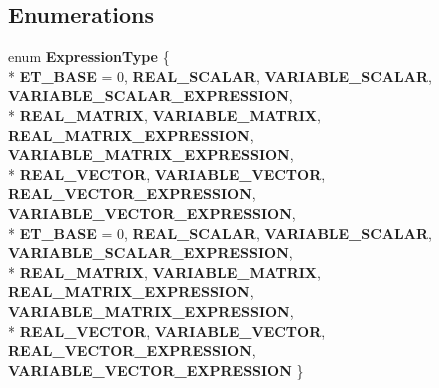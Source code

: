 \subsection*{Enumerations}
\begin{DoxyCompactItemize}
\item 
\hypertarget{namespaceatl_a9d5ac58a60edcd80977d4b562141d9a3}{enum {\bfseries Expression\+Type} \{ \\*
{\bfseries E\+T\+\_\+\+B\+A\+S\+E} = 0, 
{\bfseries R\+E\+A\+L\+\_\+\+S\+C\+A\+L\+A\+R}, 
{\bfseries V\+A\+R\+I\+A\+B\+L\+E\+\_\+\+S\+C\+A\+L\+A\+R}, 
{\bfseries V\+A\+R\+I\+A\+B\+L\+E\+\_\+\+S\+C\+A\+L\+A\+R\+\_\+\+E\+X\+P\+R\+E\+S\+S\+I\+O\+N}, 
\\*
{\bfseries R\+E\+A\+L\+\_\+\+M\+A\+T\+R\+I\+X}, 
{\bfseries V\+A\+R\+I\+A\+B\+L\+E\+\_\+\+M\+A\+T\+R\+I\+X}, 
{\bfseries R\+E\+A\+L\+\_\+\+M\+A\+T\+R\+I\+X\+\_\+\+E\+X\+P\+R\+E\+S\+S\+I\+O\+N}, 
{\bfseries V\+A\+R\+I\+A\+B\+L\+E\+\_\+\+M\+A\+T\+R\+I\+X\+\_\+\+E\+X\+P\+R\+E\+S\+S\+I\+O\+N}, 
\\*
{\bfseries R\+E\+A\+L\+\_\+\+V\+E\+C\+T\+O\+R}, 
{\bfseries V\+A\+R\+I\+A\+B\+L\+E\+\_\+\+V\+E\+C\+T\+O\+R}, 
{\bfseries R\+E\+A\+L\+\_\+\+V\+E\+C\+T\+O\+R\+\_\+\+E\+X\+P\+R\+E\+S\+S\+I\+O\+N}, 
{\bfseries V\+A\+R\+I\+A\+B\+L\+E\+\_\+\+V\+E\+C\+T\+O\+R\+\_\+\+E\+X\+P\+R\+E\+S\+S\+I\+O\+N}, 
\\*
{\bfseries E\+T\+\_\+\+B\+A\+S\+E} = 0, 
{\bfseries R\+E\+A\+L\+\_\+\+S\+C\+A\+L\+A\+R}, 
{\bfseries V\+A\+R\+I\+A\+B\+L\+E\+\_\+\+S\+C\+A\+L\+A\+R}, 
{\bfseries V\+A\+R\+I\+A\+B\+L\+E\+\_\+\+S\+C\+A\+L\+A\+R\+\_\+\+E\+X\+P\+R\+E\+S\+S\+I\+O\+N}, 
\\*
{\bfseries R\+E\+A\+L\+\_\+\+M\+A\+T\+R\+I\+X}, 
{\bfseries V\+A\+R\+I\+A\+B\+L\+E\+\_\+\+M\+A\+T\+R\+I\+X}, 
{\bfseries R\+E\+A\+L\+\_\+\+M\+A\+T\+R\+I\+X\+\_\+\+E\+X\+P\+R\+E\+S\+S\+I\+O\+N}, 
{\bfseries V\+A\+R\+I\+A\+B\+L\+E\+\_\+\+M\+A\+T\+R\+I\+X\+\_\+\+E\+X\+P\+R\+E\+S\+S\+I\+O\+N}, 
\\*
{\bfseries R\+E\+A\+L\+\_\+\+V\+E\+C\+T\+O\+R}, 
{\bfseries V\+A\+R\+I\+A\+B\+L\+E\+\_\+\+V\+E\+C\+T\+O\+R}, 
{\bfseries R\+E\+A\+L\+\_\+\+V\+E\+C\+T\+O\+R\+\_\+\+E\+X\+P\+R\+E\+S\+S\+I\+O\+N}, 
{\bfseries V\+A\+R\+I\+A\+B\+L\+E\+\_\+\+V\+E\+C\+T\+O\+R\+\_\+\+E\+X\+P\+R\+E\+S\+S\+I\+O\+N}
 \}}\label{namespaceatl_a9d5ac58a60edcd80977d4b562141d9a3}


\end{DoxyCompactItemize}
